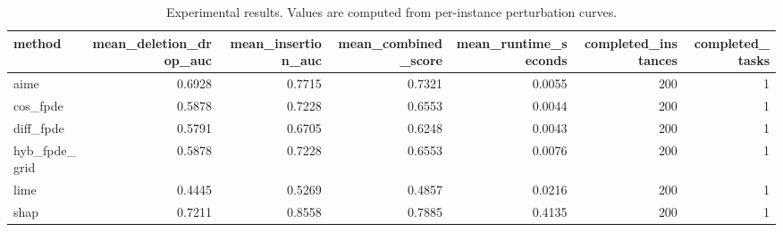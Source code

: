 \begin{table}[t]
\caption{Experimental results. Values are computed from per-instance perturbation curves.}
\label{tab:main_results_computed}
\centering
\begin{tabular}{lrrrrrr}
\toprule
method & mean\_deletion\_drop\_auc & mean\_insertion\_auc & mean\_combined\_score & mean\_runtime\_seconds & completed\_instances & completed\_tasks \\
\midrule
aime & 0.6928 & 0.7715 & 0.7321 & 0.0055 & 200 & 1 \\
cos\_fpde & 0.5878 & 0.7228 & 0.6553 & 0.0044 & 200 & 1 \\
diff\_fpde & 0.5791 & 0.6705 & 0.6248 & 0.0043 & 200 & 1 \\
hyb\_fpde\_grid & 0.5878 & 0.7228 & 0.6553 & 0.0076 & 200 & 1 \\
lime & 0.4445 & 0.5269 & 0.4857 & 0.0216 & 200 & 1 \\
shap & 0.7211 & 0.8558 & 0.7885 & 0.4135 & 200 & 1 \\
\bottomrule
\end{tabular}

\end{table}
